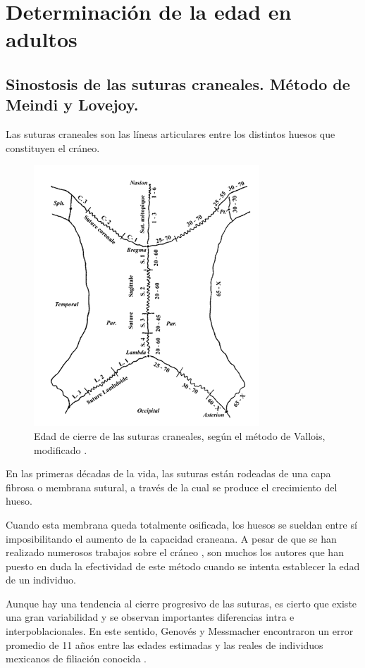 \documentclass[a4paper,11pt]{article}
\begin{document}
\section{Determinación de la edad en adultos}
\subsection{Sinostosis de las suturas craneales. Método de Meindi y Lovejoy.}
Las suturas craneales son las líneas articulares entre los distintos huesos que constituyen el cráneo.
\begin{figure}[h!]
\centering
\includegraphics[scale=1]{9.png}
\caption{Edad de cierre de las suturas craneales, según el método de Vallois, modificado \cite{olivier1960pratique}.}
\end{figure}
En las primeras décadas de la vida, las suturas están rodeadas de una capa fibrosa o membrana sutural, a través de la cual se produce el crecimiento del hueso.

Cuando esta membrana queda totalmente osificada, los huesos se sueldan entre sí imposibilitando el aumento de la capacidad craneana. A pesar de que se han realizado numerosos trabajos sobre el cráneo \cite{todd1924endocranial, mckern1957skeletal, nemeskeri1960methoden},  son muchos los autores que han puesto en duda la efectividad de este método cuando se intenta establecer la edad de un individuo\cite{masset1989age}.

Aunque hay una tendencia al cierre progresivo de las suturas, es cierto que existe una gran variabilidad y se observan importantes diferencias intra e interpoblacionales. En este sentido, Genovés y Messmacher encontraron un error promedio de 11 años entre las edades estimadas y las reales de individuos mexicanos de filiación conocida \cite{genoves1959valor}.
\end{document}
